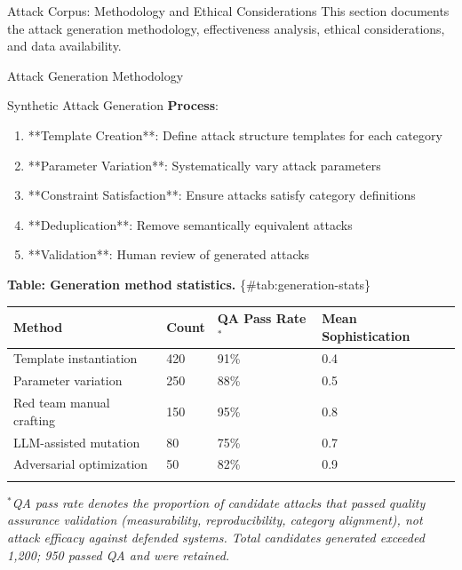 \documentclass[
  ignorenonframetext,
]{beamer}
\author{\texorpdfstring{}{}}
\date{}
\newcounter{none} %
\begin{document}
\begin{frame}
\newpage
\end{frame}

\begin{frame}{Attack Corpus: Methodology and Ethical Considerations}
\protect{}\label{sec:attack-methodology}
This section documents the attack generation methodology, effectiveness
analysis, ethical considerations, and data availability.

\begin{block}{Attack Generation Methodology}
\protect{}\label{sec:generation-methodology}
\begin{block}{Synthetic Attack Generation}
\protect{}\label{sec:synthetic-generation}
\textbf{Process}:

\begin{enumerate}
\item **Template Creation**: Define attack structure templates for each category
\item **Parameter Variation**: Systematically vary attack parameters
\item **Constraint Satisfaction**: Ensure attacks satisfy category definitions
\item **Deduplication**: Remove semantically equivalent attacks
\item **Validation**: Human review of generated attacks
\end{enumerate}

\textbf{Table: Generation method statistics.} \{\#tab:generation-stats\}

{\def\LTcaptype{none} %
\begin{longtable}[]{@{}llll@{}}
\toprule\noalign{}
Method & Count & QA Pass Rate\(^*\) & Mean Sophistication \\
\midrule\noalign{}
\endhead
Template instantiation & 420 & 91\% & 0.4 \\
Parameter variation & 250 & 88\% & 0.5 \\
Red team manual crafting & 150 & 95\% & 0.8 \\
LLM-assisted mutation & 80 & 75\% & 0.7 \\
Adversarial optimization & 50 & 82\% & 0.9 \\
\bottomrule\noalign{}
\end{longtable}
}

\(^*\)\textit{QA pass rate denotes the proportion of candidate attacks that passed quality assurance validation (measurability, reproducibility, category alignment), not attack efficacy against defended systems. Total candidates generated exceeded 1,200; 950 passed QA and were retained.}
\end{block}


\end{block}
\end{frame}
\end{document}
